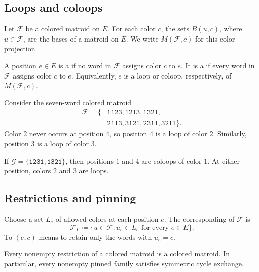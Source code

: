 \subsection[loopsAndColoops]{Loops and coloops}

Let $\mathcal F$ be a colored matroid on $E$. For each color $c$, the sets
$B(u,c)$, where $u\in\mathcal F$, are the bases of a matroid on $E$. We write
$M(\mathcal F,c)$ for this color projection.

\begin{definition}
A position $e\in E$ is a  if no word in
$\mathcal F$ assigns color $c$ to $e$. It is a 
if every word in $\mathcal F$ assigns color $c$ to $e$. Equivalently, $e$ is
a loop or coloop, respectively, of $M(\mathcal F,c)$.
\end{definition}

\begin{example}
Consider the seven-word colored matroid
\[
 \begin{aligned}
 \mathcal F=\{&\mathtt{1123},\mathtt{1213},\mathtt{1321},\\
 &\mathtt{2113},\mathtt{3121},\mathtt{2311},\mathtt{3211}\}.
 \end{aligned}
\]
Color $2$ never occurs at position $4$, so position $4$ is a loop of color
$2$. Similarly, position $3$ is a loop of color $3$.

If $\mathcal G=\{\mathtt{1231},\mathtt{1321}\}$, then positions $1$ and $4$
are coloops of color $1$. At either position, colors $2$ and $3$ are loops.
\end{example}

\subsection[restrictionsAndPinning]{Restrictions and pinning}

\begin{definition}
Choose a set $L_e$ of allowed colors at each position $e$. The corresponding
 of $\mathcal F$ is
\[
 \mathcal F_L
 \coloneqq
 \{u\in\mathcal F:u_e\in L_e\text{ for every }e\in E\}.
\]
To  $(e,c)$ means to retain only the words with $u_e=c$.
\end{definition}

\begin{proposition}[Restrictions]
Every nonempty restriction of a colored matroid is a colored matroid. In
particular, every nonempty pinned family satisfies symmetric cycle exchange.
\end{proposition}

